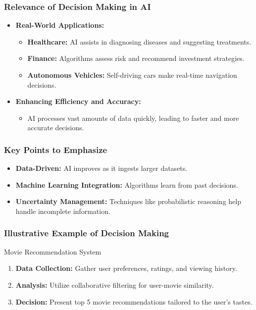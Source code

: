\documentclass[aspectratio=169]{beamer}
\begin{document}
\begin{frame}[fragile]
    \frametitle{Relevance of Decision Making in AI}
    \begin{itemize}
        \item \textbf{Real-World Applications:}
            \begin{itemize}
                \item \textbf{Healthcare:} AI assists in diagnosing diseases and suggesting treatments.
                \item \textbf{Finance:} Algorithms assess risk and recommend investment strategies.
                \item \textbf{Autonomous Vehicles:} Self-driving cars make real-time navigation decisions.
            \end{itemize}
        \item \textbf{Enhancing Efficiency and Accuracy:}
            \begin{itemize}
                \item AI processes vast amounts of data quickly, leading to faster and more accurate decisions.
            \end{itemize}
    \end{itemize}
\end{frame}

\begin{frame}[fragile]
    \frametitle{Key Points to Emphasize}
    \begin{itemize}
        \item \textbf{Data-Driven:} AI improves as it ingests larger datasets.
        \item \textbf{Machine Learning Integration:} Algorithms learn from past decisions.
        \item \textbf{Uncertainty Management:} Techniques like probabilistic reasoning help handle incomplete information.
    \end{itemize}
\end{frame}

\begin{frame}[fragile]
    \frametitle{Illustrative Example of Decision Making}
    \begin{block}{Movie Recommendation System}
        \begin{enumerate}
            \item \textbf{Data Collection:} Gather user preferences, ratings, and viewing history.
            \item \textbf{Analysis:} Utilize collaborative filtering for user-movie similarity.
            \item \textbf{Decision:} Present top 5 movie recommendations tailored to the user's tastes.
        \end{enumerate}
    \end{block}
\end{frame}
\end{document}
